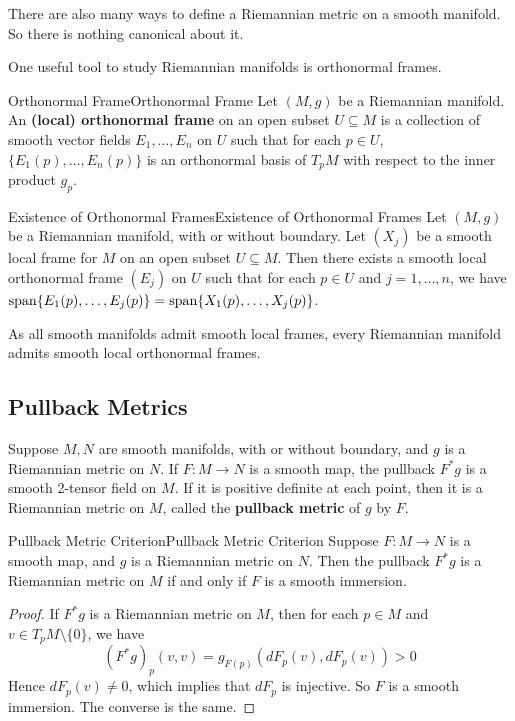 \documentclass[../main.tex]{subfiles}
\begin{document}
There are also many ways to define a Riemannian metric on a smooth manifold. So there is nothing canonical about it.

One useful tool to study Riemannian manifolds is orthonormal frames.
\begin{definition}{Orthonormal Frame}{Orthonormal Frame}
  Let $(M,g)$ be a Riemannian manifold. An \textbf{(local) orthonormal frame} on an open subset $U\subseteq M$ is a collection of smooth vector fields $E_1, \ldots, E_n$ on $U$ such that for each $p\in U$, $\{E_1(p), \ldots, E_n(p)\}$ is an orthonormal basis of $T_pM$ with respect to the inner product $g_p$.
\end{definition}

\begin{proposition}{Existence of Orthonormal Frames}{Existence of Orthonormal Frames}
  Let $(M,g)$ be a Riemannian manifold, with or without boundary. Let $(X_j)$ be a smooth local frame for $M$ on an open subset $U\subseteq M$. Then there exists a smooth local orthonormal frame $(E_j)$ on $U$ such that for each $p\in U$ and $j=1, \ldots, n$, we have $\operatorname{span}\{E_1(p), \ldots, E_j(p)\} = \operatorname{span}\{X_1(p), \ldots, X_j(p)\}$.

  As all smooth manifolds admit smooth local frames, every Riemannian manifold admits smooth local orthonormal frames.
\end{proposition}

\subsection{Pullback Metrics}
Suppose $M,N$ are smooth manifolds, with or without boundary, and $g$ is a Riemannian metric on $N$. If $F:M\to N$ is a smooth map, the pullback $F^*g$ is a smooth 2-tensor field on $M$. If it is positive definite at each point, then it is a Riemannian metric on $M$, called the \textbf{pullback metric} of $g$ by $F$.

\begin{proposition}{Pullback Metric Criterion}{Pullback Metric Criterion}
  Suppose $F:M\to N$ is a smooth map, and $g$ is a Riemannian metric on $N$. Then the pullback $F^*g$ is a Riemannian metric on $M$ if and only if $F$ is a smooth immersion.
\end{proposition}
\begin{proof}
  If $F^*g$ is a Riemannian metric on $M$, then for each $p\in M$ and $v\in T_pM\setminus \{0\}$, we have
  \begin{equation*}
    (F^*g)_p(v,v) = g_{F(p)}(dF_p(v), dF_p(v)) > 0
  \end{equation*}
  Hence $dF_p(v)\neq 0$, which implies that $dF_p$ is injective. So $F$ is a smooth immersion. The converse is the same.
\end{proof}
\end{document}
